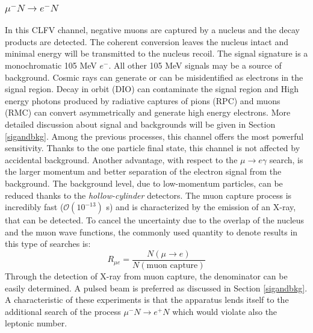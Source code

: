 \subsubsection{$\mu^- N \rightarrow e^- N $}
In this CLFV channel, negative muons are captured by a nucleus and the decay products are detected. The coherent conversion leaves the nucleus
intact and minimal energy will be transmitted to the nucleus recoil.
The signal signature is a monochromatic 105 MeV $e^-$. All other 105 MeV signals may be a source of background. 
Cosmic rays can generate or can be misidentified as electrons in the signal region.
Decay in orbit (DIO) can contaminate the signal region and High energy photons produced by radiative captures of pions (RPC) and muons (RMC) can convert 
asymmetrically and generate high energy electrons. More detailed discussion about signal and backgrounds will be given in Section \ref{sigandbkg}.
Among the previous processes, this channel offers the most powerful sensitivity. 
Thanks to the one particle final state, this channel is not affected by accidental background.
Another advantage, with respect to the $\mu \rightarrow e \gamma$ search, is the larger momentum
and better separation of the electron signal from the background. The background level, due to low-momentum particles, can be reduced
thanks to the \textit{hollow-cylinder} detectors. The muon capture process is incredibly fast ($\mathcal{O}(10^{-13})$ s) and is characterized by the emission of
an X-ray, that can be detected. To cancel the uncertainty due to the overlap of the nucleus and the muon wave
functions, the commonly used quantity to denote results in this type of searches is:
\begin{equation}
    R_{\mu e}=\frac{N(\mu \rightarrow e)}{N(\text{muon capture})}
\end{equation}
Through the detection of X-ray from muon capture, the denominator can be easily determined.
A pulsed beam is preferred as discussed in Section \ref{sigandbkg}.
A characteristic of these experiments is that the apparatus lends itself to the additional
search of the process $\mu^- N \rightarrow e^+ N$ which would violate also the leptonic number.
